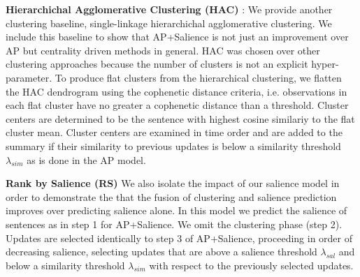 \textbf{Hierarchichal Agglomerative Clustering (HAC)} : We provide another clustering baseline, single-linkage hierarchichal agglomerative clustering.
We include this baseline to show that AP+Salience is not just an improvement
over AP but centrality driven methods in general.
HAC was chosen over other clustering approaches because the number of clusters 
is not an explicit hyper-parameter. To produce flat clusters from the hierarchical clustering, we flatten the HAC dendrogram
using the cophenetic distance criteria, i.e. observations in each flat cluster have no greater a cophenetic distance than a threshold.
Cluster centers are determined to be the sentence with highest cosine similariy to the flat cluster mean.
Cluster centers are examined in time order and are added to the summary if their similarity to previous updates is below a similarity threshold $\lambda_{sim}$ as is done in the AP model.

\textbf{Rank by Salience (RS)} 
We also isolate the impact of our salience model in order to demonstrate 
the that the fusion of clustering and salience prediction improves over
predicting salience alone.
In this model we predict the salience of sentences as in step 1 for 
AP+Salience. %
We omit the clustering phase (step 2).
Updates are selected identically to step 3 of AP+Salience, proceeding 
in order of decreasing salience, selecting updates that are above a salience 
threshold $\lambda_{sal}$ and below a similarity threshold $\lambda_{sim}$
with respect to the previously selected updates.


%
